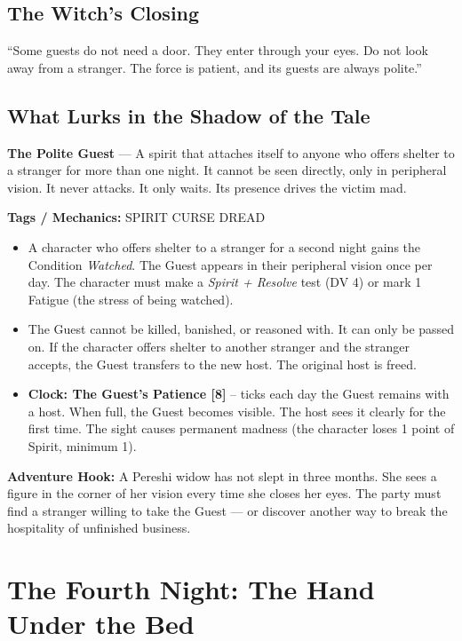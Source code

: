 \documentclass[10pt,twoside]{book}
\newcommand{\tag}[1]{\textsc{#1}}
\begin{document}
\section*{The Witch's Closing}
``Some guests do not need a door. They enter through your eyes. Do not look away from a stranger. The force is patient, and its guests are always polite.''

\section*{What Lurks in the Shadow of the Tale}
\begin{infobox}
\textbf{The Polite Guest} --- A spirit that attaches itself to anyone who offers shelter to a stranger for more than one night. It cannot be seen directly, only in peripheral vision. It never attacks. It only waits. Its presence drives the victim mad.

\textbf{Tags / Mechanics:} \tag{SPIRIT} \tag{CURSE} \tag{DREAD}

\begin{itemize}
\item A character who offers shelter to a stranger for a second night gains the Condition \textit{Watched}. The Guest appears in their peripheral vision once per day. The character must make a \textit{Spirit + Resolve} test (DV 4) or mark 1 Fatigue (the stress of being watched).
\item The Guest cannot be killed, banished, or reasoned with. It can only be passed on. If the character offers shelter to another stranger and the stranger accepts, the Guest transfers to the new host. The original host is freed.
\item \textbf{Clock: The Guest's Patience [8]} -- ticks each day the Guest remains with a host. When full, the Guest becomes visible. The host sees it clearly for the first time. The sight causes permanent madness (the character loses 1 point of Spirit, minimum 1).
\end{itemize}

\textbf{Adventure Hook:} A Pereshi widow has not slept in three months. She sees a figure in the corner of her vision every time she closes her eyes. The party must find a stranger willing to take the Guest --- or discover another way to break the hospitality of unfinished business.
\end{infobox}

\chapter{The Fourth Night: The Hand Under the Bed}
\end{document}
